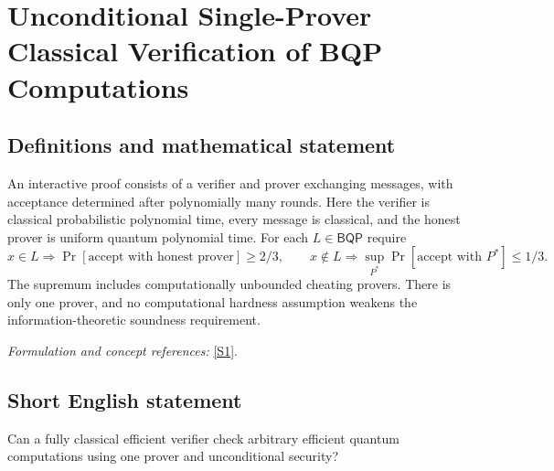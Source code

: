 \documentclass[11pt,a4paper]{article}
\newcommand{\sref}[2]{\hyperlink{source:#1:#2}{[S#2]}}
\newif\ifshowcatalogue
\newcommand{\cataloguescope}[1]{\ifshowcatalogue
 \paragraph{Exact scope in the supplied catalogue.}
 \begin{quote}\small #1\end{quote}\fi}
\numberwithin{equation}{section}
\begin{document}
\setcounter{section}{0}
\setlength{\parskip}{3pt plus 1pt}
\clearpage
\section*{\texorpdfstring{Unconditional Single-Prover Classical Verification of BQP Computations}{Unconditional Single-Prover Classical Verification of BQP Computations}}\label{30006741}
\subsection{Definitions and mathematical statement}
An interactive proof consists of a verifier and prover exchanging messages, with acceptance determined after polynomially many rounds. Here the verifier is classical probabilistic polynomial time, every message is classical, and the honest prover is uniform quantum polynomial time. For each $L\in\mathsf{BQP}$ require
\[
 x\in L\Rightarrow\Pr[\text{accept with honest prover}]\ge2/3,\qquad
 x\notin L\Rightarrow\sup_{P^*}\Pr[\text{accept with }P^*]\le1/3.
\]
The supremum includes computationally unbounded cheating provers. There is only one prover, and no computational hardness assumption weakens the information-theoretic soundness requirement.
\par\smallskip\textit{Formulation and concept references:} \sref{30006741}{1}.
\cataloguescope{Determine whether every language L in BQP admits a polynomial-round interactive proof with only classical messages between a probabilistic classical polynomial-time verifier and a single honest uniform quantum polynomial-time prover, with completeness at least 2/3 and soundness at most 1/3 against every computationally unbounded cheating prover.}
\subsection{Short English statement}
Can a fully classical efficient verifier check arbitrary efficient quantum computations using one prover and unconditional security?
\end{document}
